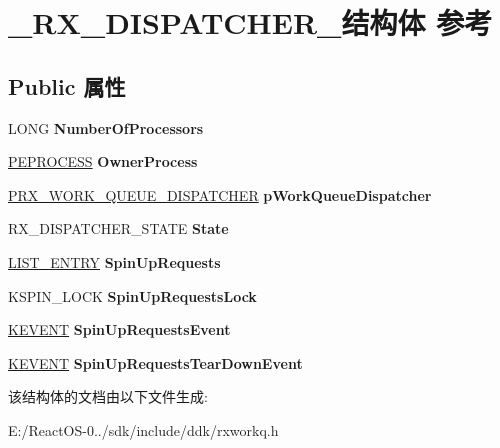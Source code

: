 \hypertarget{struct___r_x___d_i_s_p_a_t_c_h_e_r__}{}\section{\+\_\+\+R\+X\+\_\+\+D\+I\+S\+P\+A\+T\+C\+H\+E\+R\+\_\+结构体 参考}
\label{struct___r_x___d_i_s_p_a_t_c_h_e_r__}
\subsection*{Public 属性}
\begin{DoxyCompactItemize}
\item 
\mbox{\label{struct___r_x___d_i_s_p_a_t_c_h_e_r___a1288b3e022f4a78462d6056482462a8a}} 
L\+O\+NG {\bfseries Number\+Of\+Processors}
\item 
\mbox{\label{struct___r_x___d_i_s_p_a_t_c_h_e_r___a40250d9cfcd6827e46f017d61ccd9c77}} 
\hyperlink{struct___e_p_r_o_c_e_s_s}{P\+E\+P\+R\+O\+C\+E\+SS} {\bfseries Owner\+Process}
\item 
\mbox{\label{struct___r_x___d_i_s_p_a_t_c_h_e_r___a39ee7ad1f3eb4d6fd05e86f4eff55e9b}} 
\hyperlink{struct___r_x___w_o_r_k___q_u_e_u_e___d_i_s_p_a_t_c_h_e_r__}{P\+R\+X\+\_\+\+W\+O\+R\+K\+\_\+\+Q\+U\+E\+U\+E\+\_\+\+D\+I\+S\+P\+A\+T\+C\+H\+ER} {\bfseries p\+Work\+Queue\+Dispatcher}
\item 
\mbox{\label{struct___r_x___d_i_s_p_a_t_c_h_e_r___a642ad006c36e0c4f2f155aee917295c8}} 
R\+X\+\_\+\+D\+I\+S\+P\+A\+T\+C\+H\+E\+R\+\_\+\+S\+T\+A\+TE {\bfseries State}
\item 
\mbox{\label{struct___r_x___d_i_s_p_a_t_c_h_e_r___a6f174b20ec89b4b8fc38dfef5f52a1ed}} 
\hyperlink{struct___l_i_s_t___e_n_t_r_y}{L\+I\+S\+T\+\_\+\+E\+N\+T\+RY} {\bfseries Spin\+Up\+Requests}
\item 
\mbox{\label{struct___r_x___d_i_s_p_a_t_c_h_e_r___a8645012332c0a224b735e7b284fa92f3}} 
K\+S\+P\+I\+N\+\_\+\+L\+O\+CK {\bfseries Spin\+Up\+Requests\+Lock}
\item 
\mbox{\label{struct___r_x___d_i_s_p_a_t_c_h_e_r___acbd33b1ef69958d25cb9052b00aa61a8}} 
\hyperlink{struct___k_e_v_e_n_t}{K\+E\+V\+E\+NT} {\bfseries Spin\+Up\+Requests\+Event}
\item 
\mbox{\label{struct___r_x___d_i_s_p_a_t_c_h_e_r___a45350013e75cd532967489243472444c}} 
\hyperlink{struct___k_e_v_e_n_t}{K\+E\+V\+E\+NT} {\bfseries Spin\+Up\+Requests\+Tear\+Down\+Event}
\end{DoxyCompactItemize}


该结构体的文档由以下文件生成\+:\begin{DoxyCompactItemize}
\item 
E\+:/\+React\+O\+S-\/0../sdk/include/ddk/rxworkq.\+h\end{DoxyCompactItemize}
